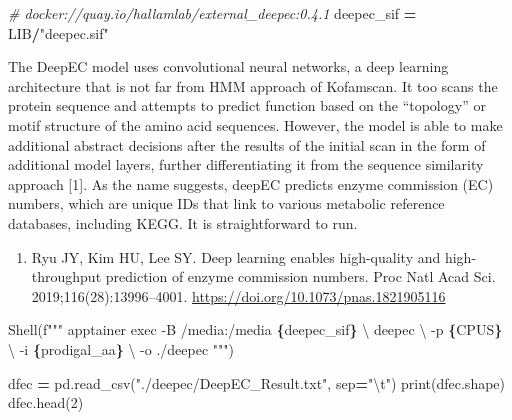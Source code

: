 \documentclass[
]{book}
\newenvironment{Shaded}{\begin{snugshade}}{\end{snugshade}}
\newcommand{\BuiltInTok}[1]{#1}
\newcommand{\CharTok}[1]{\textcolor[rgb]{0.31,0.60,0.02}{#1}}
\newcommand{\CommentTok}[1]{\textcolor[rgb]{0.56,0.35,0.01}{\textit{#1}}}
\newcommand{\DecValTok}[1]{\textcolor[rgb]{0.00,0.00,0.81}{#1}}
\newcommand{\NormalTok}[1]{#1}
\newcommand{\OperatorTok}[1]{\textcolor[rgb]{0.81,0.36,0.00}{\textbf{#1}}}
\newcommand{\SpecialCharTok}[1]{\textcolor[rgb]{0.81,0.36,0.00}{\textbf{#1}}}
\newcommand{\SpecialStringTok}[1]{\textcolor[rgb]{0.31,0.60,0.02}{#1}}
\newcommand{\StringTok}[1]{\textcolor[rgb]{0.31,0.60,0.02}{#1}}
\providecommand{\tightlist}{%
  \setlength{\itemsep}{0pt}\setlength{\parskip}{0pt}}
\begin{document}
\begin{Shaded}
\begin{Highlighting}[numbers=left,,]
\CommentTok{\# docker://quay.io/hallamlab/external\_deepec:0.4.1}
\NormalTok{deepec\_sif }\OperatorTok{=}\NormalTok{ LIB}\OperatorTok{/}\StringTok{"deepec.sif"}
\end{Highlighting}
\end{Shaded}

The DeepEC model uses convolutional neural networks, a deep learning architecture that is not far from HMM approach of Kofamscan.
It too scans the protein sequence and attempts to predict function based on the ``topology'' or motif structure of the amino acid sequences.
However, the model is able to make additional abstract decisions after the results of the initial scan in the form of additional model layers,
further differentiating it from the sequence similarity approach {[}1{]}. As the name suggests, deepEC predicts enzyme commission (EC) numbers,
which are unique IDs that link to various metabolic reference databases, including KEGG. It is straightforward to run.

\begin{enumerate}
\def\labelenumi{\arabic{enumi}.}
\tightlist
\item
  Ryu JY, Kim HU, Lee SY. Deep learning enables high-quality and high-throughput prediction of enzyme commission numbers. Proc Natl Acad Sci. 2019;116(28):13996--4001. \url{https://doi.org/10.1073/pnas.1821905116}
\end{enumerate}

\begin{Shaded}
\begin{Highlighting}[numbers=left,,]
\NormalTok{Shell(}\SpecialStringTok{f"""}
\SpecialStringTok{apptainer exec {-}B /media:/media }\SpecialCharTok{\{}\NormalTok{deepec\_sif}\SpecialCharTok{\}}\SpecialStringTok{ }\CharTok{\textbackslash{}}
\SpecialStringTok{    deepec }\CharTok{\textbackslash{}}
\SpecialStringTok{        {-}p }\SpecialCharTok{\{}\NormalTok{CPUS}\SpecialCharTok{\}}\SpecialStringTok{ }\CharTok{\textbackslash{}}
\SpecialStringTok{        {-}i }\SpecialCharTok{\{}\NormalTok{prodigal\_aa}\SpecialCharTok{\}}\SpecialStringTok{ }\CharTok{\textbackslash{}}
\SpecialStringTok{        {-}o ./deepec}
\SpecialStringTok{"""}\NormalTok{)}
\end{Highlighting}
\end{Shaded}

\begin{Shaded}
\begin{Highlighting}[numbers=left,,]
\NormalTok{dfec }\OperatorTok{=}\NormalTok{ pd.read\_csv(}\StringTok{"./deepec/DeepEC\_Result.txt"}\NormalTok{, sep}\OperatorTok{=}\StringTok{"}\CharTok{\textbackslash{}t}\StringTok{"}\NormalTok{)}
\BuiltInTok{print}\NormalTok{(dfec.shape)}
\NormalTok{dfec.head(}\DecValTok{2}\NormalTok{)}
\end{Highlighting}
\end{Shaded}
\end{document}
